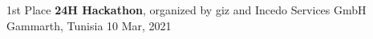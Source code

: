 
\begin{cvhonors}

  \cvhonor
    {1st Place} %
    {\textbf{24H Hackathon}, organized by giz and Incedo Services GmbH} %
    {Gammarth, Tunisia} %
    {10 Mar,
2021} %


\end{cvhonors}
